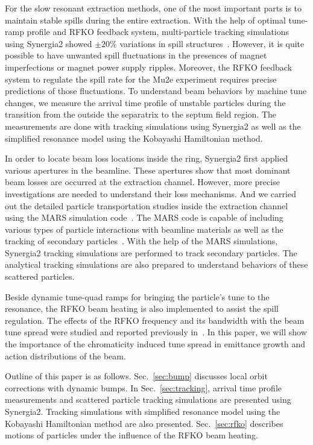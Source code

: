\documentclass[aps,prstab,onecolumn,preprint]{revtex4-1}
\begin{document}
For the slow resonant extraction methods, one of the most important parts is to maintain stable spills during the entire extraction. With the help of optimal tune-ramp profile and RFKO feedback system, multi-particle tracking simulations using Synergia2 showed \mbox{$\pm 20\%$} variations in spill structures~\cite{mu2e}. However, it is quite possible to have unwanted spill fluctuations in the presences of magnet imperfections or magnet power supply ripples. Moreover, the RFKO feedback system to regulate the spill rate for the Mu2e experiment requires precise predictions of those fluctuations. To understand beam behaviors by machine tune changes, we measure the arrival time profile of unstable particles during the transition from the outside the separatrix to the septum field region. The measurements are done with tracking simulations using Synergia2 as well as the simplified resonance model using the Kobayashi Hamiltonian method.

In order to locate beam loss locations inside the ring, Synergia2 first applied various apertures in the beamline. These apertures show that most dominant beam losses are occurred at the extraction channel. However, more precise investigations are needed to understand their loss mechanisms. And we carried out the detailed particle transportation studies inside the extraction channel using the MARS simulation code~\cite{mars1}. The MARS code is capable of including various types of particle interactions with beamline materials as well as the tracking of secondary particles~\cite{mars2}. With the help of the MARS simulations, Synergia2 tracking simulations are performed to track secondary particles. The analytical tracking simulations are also prepared to understand behaviors of these scattered particles. 

Beside dynamic tune-quad ramps for bringing the particle's tune to the resonance, the RFKO beam heating is also implemented to assist the spill regulation. The effects of the RFKO frequency and its bandwidth with the beam tune spread were studied and reported previously in~\cite{ipac11}. In this paper, we will show the importance of the chromaticity induced tune spread in emittance growth and action distributions of the beam.

Outline of this paper is as follows. Sec.~\ref{sec:bump} discusses local orbit corrections with dynamic bumps. In Sec.~\ref{sec:tracking}, arrival time profile measurements and scattered particle tracking simulations are presented using Synergia2. Tracking simulations with simplified resonance model using the Kobayashi Hamiltonian method are also presented. Sec.~\ref{sec:rfko} describes motions of particles under the influence of the RFKO beam heating.
\end{document}
